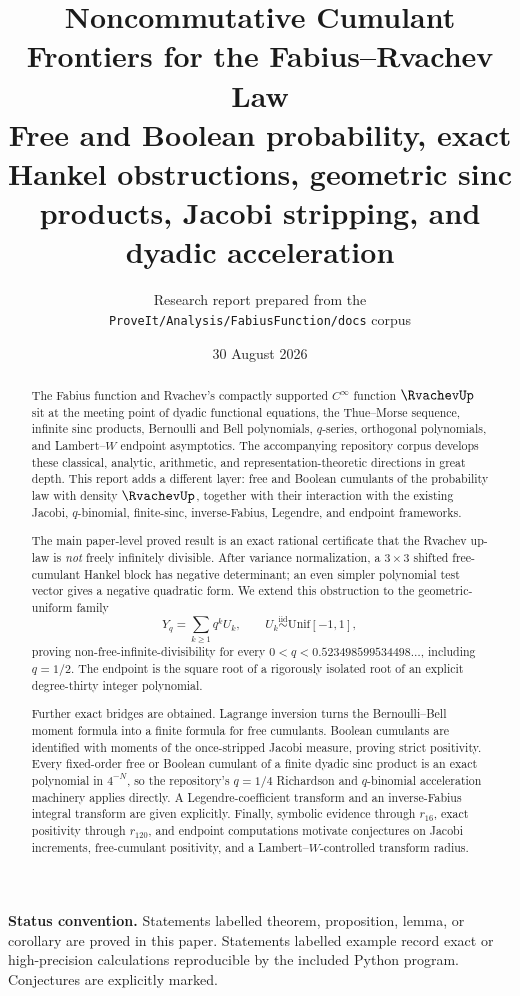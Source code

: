 \documentclass[11pt,oneside]{article}
\title{\bfseries Noncommutative Cumulant Frontiers for the Fabius--Rvachev Law\\[0.4em]
\large Free and Boolean probability, exact Hankel obstructions, geometric sinc products, Jacobi stripping, and dyadic acceleration}
\author{Research report prepared from the\\
  \texttt{ProveIt/Analysis/FabiusFunction/docs} corpus}
\date{30 August 2026}
\theoremstyle{definition}
\theoremstyle{remark}
\begin{document}
\maketitle
\begin{abstract}
The Fabius function and Rvachev's compactly supported \(C^\infty\) function \(\RvachevUp\) sit at the meeting point of dyadic functional equations, the Thue--Morse sequence, infinite sinc products, Bernoulli and Bell polynomials, \(q\)-series, orthogonal polynomials, and Lambert--\(W\) endpoint asymptotics. The accompanying repository corpus develops these classical, analytic, arithmetic, and representation-theoretic directions in great depth. This report adds a different layer: free and Boolean cumulants of the probability law with density \(\RvachevUp\), together with their interaction with the existing Jacobi, \(q\)-binomial, finite-sinc, inverse-Fabius, Legendre, and endpoint frameworks.

The main paper-level proved result is an exact rational certificate that the Rvachev up-law is \emph{not} freely infinitely divisible. After variance normalization, a \(3\times3\) shifted free-cumulant Hankel block has negative determinant; an even simpler polynomial test vector gives a negative quadratic form. We extend this obstruction to the geometric-uniform family
\[
Y_q=\sum_{k\ge1}q^kU_k,\qquad U_k\stackrel{\mathrm{iid}}\sim \mathrm{Unif}[-1,1],
\]
proving non-free-infinite-divisibility for every \(0<q<0.523498599534498\ldots\), including \(q=1/2\). The endpoint is the square root of a rigorously isolated root of an explicit degree-thirty integer polynomial.

Further exact bridges are obtained. Lagrange inversion turns the Bernoulli--Bell moment formula into a finite formula for free cumulants. Boolean cumulants are identified with moments of the once-stripped Jacobi measure, proving strict positivity. Every fixed-order free or Boolean cumulant of a finite dyadic sinc product is an exact polynomial in \(4^{-N}\), so the repository's \(q=1/4\) Richardson and \(q\)-binomial acceleration machinery applies directly. A Legendre-coefficient transform and an inverse-Fabius integral transform are given explicitly. Finally, symbolic evidence through \(r_{16}\), exact positivity through \(r_{120}\), and endpoint computations motivate conjectures on Jacobi increments, free-cumulant positivity, and a Lambert--\(W\)-controlled transform radius.
\end{abstract}

\noindent\textbf{Status convention.}
Statements labelled theorem, proposition, lemma, or corollary are proved in
this paper.  Statements labelled example record exact or high-precision
calculations reproducible by the included Python program.  Conjectures are
explicitly marked.
\end{document}

